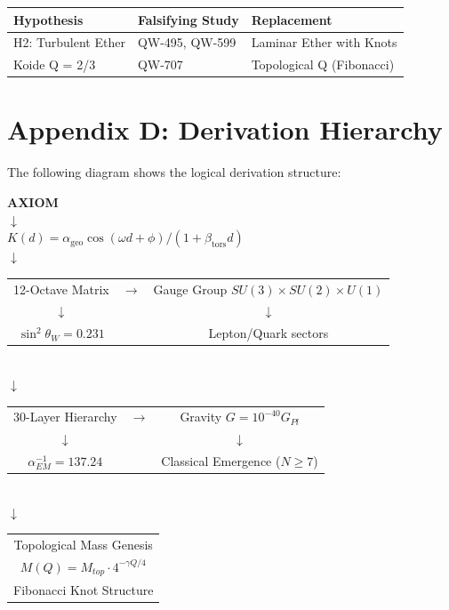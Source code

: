 \documentclass[11pt, a4paper]{article}
\theoremstyle{remark}
\newcommand{\alphageo}{\alpha_{\text{geo}}}
\newcommand{\betators}{\beta_{\text{tors}}}
\begin{document}
\begin{center}
\begin{tabular}{|l|l|l|}
\hline
\textbf{Hypothesis} & \textbf{Falsifying Study} & \textbf{Replacement} \\
\hline
H2: Turbulent Ether & QW-495, QW-599 & Laminar Ether with Knots \\
Koide Q = 2/3 & QW-707 & Topological Q (Fibonacci) \\
\hline
\end{tabular}
\end{center}

\section{Appendix D: Derivation Hierarchy}

The following diagram shows the logical derivation structure:

\begin{center}
\textbf{AXIOM} \\
$\downarrow$ \\
$K(d) = \alphageo \cos(\omega d + \phi) / (1 + \betators d)$ \\
$\downarrow$ \\
\begin{tabular}{ccc}
12-Octave Matrix & $\rightarrow$ & Gauge Group $SU(3) \times SU(2) \times U(1)$ \\
$\downarrow$ & & $\downarrow$ \\
$\sin^2\theta_W = 0.231$ & & Lepton/Quark sectors \\
\end{tabular}
\\[0.5cm]
$\downarrow$ \\
\begin{tabular}{ccc}
30-Layer Hierarchy & $\rightarrow$ & Gravity $G = 10^{-40} G_{Pl}$ \\
$\downarrow$ & & $\downarrow$ \\
$\alpha_{EM}^{-1} = 137.24$ & & Classical Emergence ($N \geq 7$) \\
\end{tabular}
\\[0.5cm]
$\downarrow$ \\
\begin{tabular}{c}
Topological Mass Genesis \\
$M(Q) = M_{top} \cdot 4^{-\gamma Q/4}$ \\
Fibonacci Knot Structure \\
\end{tabular}
\end{center}
\end{document}
